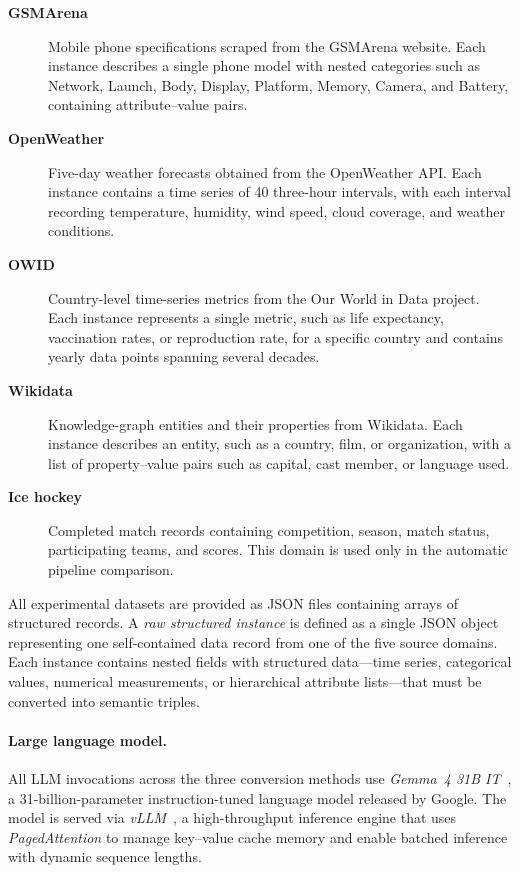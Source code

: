 \begin{description}
  \item[\textbf{GSMArena}] Mobile phone specifications scraped from the GSMArena
  website. Each instance describes a single phone model with nested categories
  such as Network, Launch, Body, Display, Platform, Memory, Camera, and
  Battery, containing attribute--value pairs.

  \item[\textbf{OpenWeather}] Five-day weather forecasts obtained from the
  OpenWeather API. Each instance contains a time series of 40 three-hour
  intervals, with each interval recording temperature, humidity, wind speed,
  cloud coverage, and weather conditions.

  \item[\textbf{OWID}] Country-level time-series metrics from the Our World in
  Data project. Each instance represents a single metric, such as life
  expectancy, vaccination rates, or reproduction rate, for a specific country
  and contains yearly data points spanning several decades.

  \item[\textbf{Wikidata}] Knowledge-graph entities and their properties from
  Wikidata. Each instance describes an entity, such as a country, film, or
  organization, with a list of property--value pairs such as capital, cast
  member, or language used.

  \item[\textbf{Ice hockey}] Completed match records containing competition,
  season, match status, participating teams, and scores. This domain is used
  only in the automatic pipeline comparison.
\end{description}

All experimental datasets are provided as JSON files containing arrays of
structured records. A \emph{raw structured instance} is defined as a single
JSON object representing one self-contained data record from one of the five
source domains. Each instance contains nested fields with structured
data---time series, categorical values, numerical measurements, or hierarchical
attribute lists---that must be converted into semantic triples.

\paragraph{Large language model.}
All LLM invocations across the three conversion methods use \emph{Gemma~4
31B IT}~\cite{team2024gemma,team2026gemma}, a 31-billion-parameter
instruction-tuned language model released by Google. The model is served via
\emph{vLLM}~\cite{kwon2023vllm}, a high-throughput inference engine that uses
\emph{PagedAttention} to manage key--value cache memory and enable batched
inference with dynamic sequence lengths.

